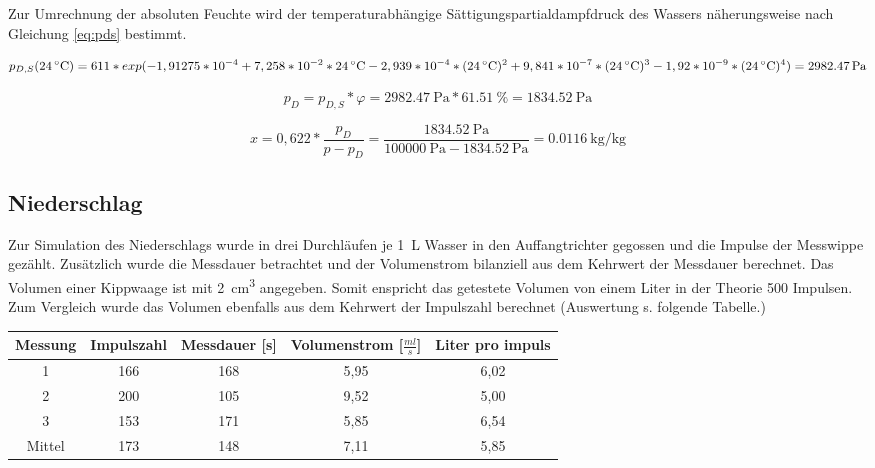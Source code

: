 Zur Umrechnung der absoluten Feuchte wird der temperaturabhängige Sättigungspartialdampfdruck des Wassers näherungsweise nach Gleichung \ref{eq:pds} bestimmt. 

\begin{equation}
	\label{eq:pds}
	p_{D,S}(\SI{24}{\celsius}) = 611*exp(-1,91275*10^{-4}+7,258*10^{-2}*\SI{24}{\celsius}-2,939*10^{-4}*(\SI{24}{\celsius})^2\linebreak+9,841*10^{-7}*(\SI{24}{\celsius})^3-1,92*10^{-9}*(\SI{24}{\celsius})^4)=\SI{2982,47}{\pascal}
\end{equation}

\begin{equation}
\label{eq:pd}
p_D=p_{D,S}*\varphi= \SI{2982,47}{\pascal}*\SI{61,51}{\percent}=\SI{1834,52}{\pascal}	
\end{equation}

\begin{equation}
	\label{eq:x}
	x=0,622*\frac{p_D}{p-p_D}=\frac{\SI{1834,52}{\pascal}}{\SI{100000}{\pascal}-\SI{1834,52}{\pascal}}=\SI{0,0116}{\kilogram\per\kilogram}
\end{equation}

		
\subsection{Niederschlag}
Zur Simulation des Niederschlags wurde in drei Durchläufen je \SI{1}{\liter} Wasser in den Auffangtrichter gegossen und die Impulse der Messwippe gezählt. Zusätzlich wurde die Messdauer betrachtet und der Volumenstrom bilanziell aus dem Kehrwert der Messdauer berechnet. Das Volumen einer Kippwaage ist mit \SI{2}{\cubic\centi\meter} angegeben. Somit enspricht das getestete Volumen von einem Liter in der Theorie 500 Impulsen. Zum Vergleich wurde das Volumen ebenfalls aus dem Kehrwert der Impulszahl berechnet (Auswertung s. folgende Tabelle.)

 \begin{center}
 	\begin{tabular}{c|c|c|c|c}
 		\label{tab:rain}
 		\textbf{Messung} & \textbf{Impulszahl} & \textbf{Messdauer} [s] & \textbf{Volumenstrom} [$\frac{ml}{s}$] & \textbf{Liter pro impuls}\\
 		\hline
 		1 & 166 & 168 & 5,95 & 6,02\\
 		2 & 200 & 105 & 9,52 & 5,00\\
 		3 & 153 & 171 & 5,85 & 6,54\\
 		Mittel & 173 & 148 & 7,11 & 5,85
 	\end{tabular}
 \end{center}

